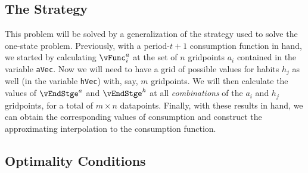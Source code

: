 \documentclass[\econtexRoot/SolvingMicroDSOPs]{subfiles}
\begin{document}
\hypertarget{The-Strategy}{}
\subsection{The Strategy}

This problem will be solved by a generalization of the strategy used
to solve the one-state problem.  Previously, with a period-$t+1$
consumption function in hand, we started by calculating
$\vFunc^{a}_{i}$ at the set of $n$ gridpoints ${a}_{i}$
contained in the variable \texttt{aVec}.  Now we will need to
have a grid of possible values for habits $h_{j}$ as well (in the
variable \texttt{hVec}) with, say, $m$ gridpoints.  We will then
calculate the values of $\vEndStge^{{a}}$ and $\vEndStge^{h}$
at all \textit{combinations} of the ${a}_{i}$ and $h_{j}$
gridpoints, for a total of $m \times n$ datapoints.  Finally, with
these results in hand, we can obtain the corresponding values of
consumption and construct the approximating interpolation to the
consumption function.

\hypertarget{Optimality-Conditions}{}
\subsection{Optimality Conditions}
\hypertarget{The-First-Orrder-Condition-for-c}{}
\end{document}
